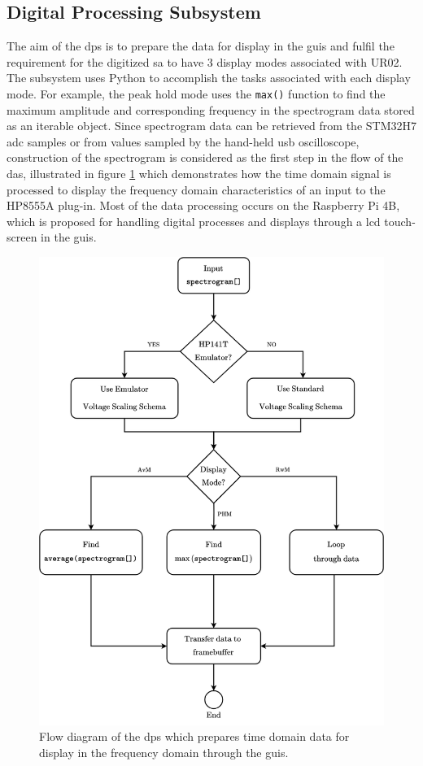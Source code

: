 \documentclass[class=report,11pt,crop=false]{standalone}
\begin{document}
	\subsection{Digital Processing Subsystem}
	
	The aim of the \acrshort{dps} is to prepare the data for display in the \acrshort{guis} and fulfil the requirement for the digitized \acrshort{sa} to have 3 display modes associated with UR02. The subsystem uses Python to accomplish the tasks associated with each display mode. For example, the peak hold mode uses the \texttt{max()} function to find the maximum amplitude and corresponding frequency in the spectrogram data stored as an iterable object. Since spectrogram data can be retrieved from the STM32H7 \acrshort{adc} samples or from values sampled by the hand-held usb oscilloscope, construction of the spectrogram is considered as the first step in the flow of the \acrshort{das}, illustrated in figure \ref{fig:dps-pipeline} which demonstrates how the time domain signal is processed to display the frequency domain characteristics of an input to the HP8555A plug-in. Most of the data processing occurs on the Raspberry Pi 4B, which is proposed for handling digital processes and displays through a \acrshort{lcd} touch-screen in the \acrshort{guis}.
	
	\begin{figure}[ht!]
		\centering
		\includegraphics[width=0.58\linewidth]{Figures/Methodology/dps-pipeline}
		\caption{Flow diagram of the \acrlong{dps} which prepares time domain data for display in the frequency domain through the \acrlong{guis}.}
		\label{fig:dps-pipeline}
	\end{figure} 
\end{document}
